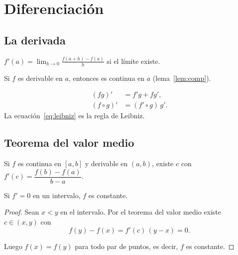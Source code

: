 \chapter{Diferenciación}

\section{La derivada}

\begin{definition}
  $f'(a)=\displaystyle\lim_{h\to0}\frac{f(a+h)-f(a)}{h}$ si el límite existe.
\end{definition}

\begin{proposition}
  Si $f$ es derivable en $a$, entonces es continua en $a$ (lema~\ref{lem:comp}).
\end{proposition}

\begin{remark}
  \begin{align}
    (fg)' &= f'g+fg', \label{eq:leibniz}\\
    (f\circ g)' &= (f'\circ g)\,g'.
  \end{align}
  La ecuación~\eqref{eq:leibniz} es la regla de Leibniz.
\end{remark}

\section{Teorema del valor medio}

\begin{theorem}
  Si $f$ es continua en $[a,b]$ y derivable en $(a,b)$, existe $c$ con
  $f'(c)=\dfrac{f(b)-f(a)}{b-a}$.
\end{theorem}

\begin{corollary}
  Si $f'=0$ en un intervalo, $f$ es constante.
\end{corollary}
\begin{proof}
  Sean $x<y$ en el intervalo. Por el teorema del valor medio existe $c\in(x,y)$ con
  \[
    f(y)-f(x)=f'(c)\,(y-x)=0.
  \]

  Luego $f(x)=f(y)$ para todo par de puntos, es decir, $f$ es constante.
\end{proof}

